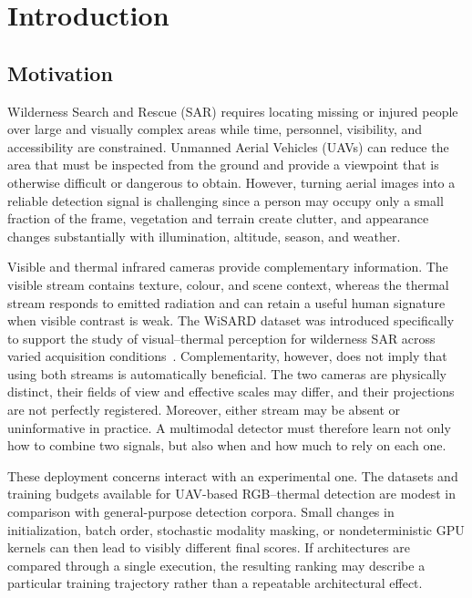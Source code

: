 \chapter{Introduction}
\label{chap:introduction}

\section{Motivation}

Wilderness Search and Rescue (SAR) requires locating missing or injured people
over large and visually complex areas while time, personnel, visibility, and
accessibility are constrained. Unmanned Aerial Vehicles (UAVs) can reduce the
area that must be inspected from the ground and provide a viewpoint that is
otherwise difficult or dangerous to obtain. However, turning aerial images into a
reliable detection signal is challenging since a person may occupy
only a small fraction of the frame, vegetation and terrain create clutter, and
appearance changes substantially with illumination, altitude, season, and
weather.

Visible and thermal infrared cameras provide complementary information. The
visible stream contains texture, colour, and scene context, whereas the thermal
stream responds to emitted radiation and can retain a useful human signature
when visible contrast is weak. The WiSARD dataset was introduced specifically to support
the study of visual--thermal perception for wilderness SAR across varied
acquisition conditions~\cite{broyles2022wisard}. Complementarity, however,
does not imply that using both streams is automatically beneficial. The two
cameras are physically distinct, their fields of view and effective scales may
differ, and their projections are not perfectly registered. Moreover, either
stream may be absent or uninformative in practice. A multimodal detector must
therefore learn not only how to combine two signals, but also when and how much
to rely on each one.

These deployment concerns interact with an experimental one. The datasets and
training budgets available for UAV-based RGB--thermal detection are modest in
comparison with general-purpose detection corpora. Small changes in
initialization, batch order, stochastic modality masking, or nondeterministic
GPU kernels can then lead to visibly different final scores. If architectures
are compared through a single execution, the resulting ranking may describe a
particular training trajectory rather than a repeatable architectural effect.

